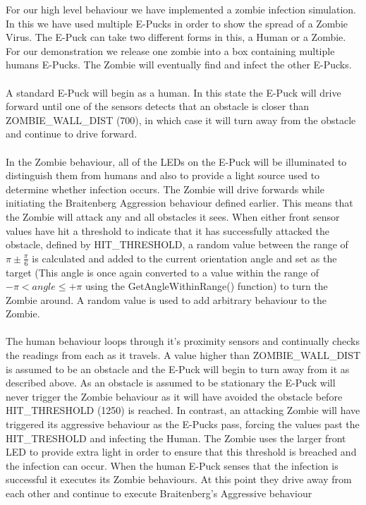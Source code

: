 \documentclass[11pt]{article}
\begin{document}
For our high level behaviour we have implemented a zombie infection simulation. In this we have used multiple E-Pucks in order to show the spread of a Zombie Virus. The E-Puck can take two different forms in this, a Human or a Zombie. For our demonstration we release one zombie into a box containing multiple humans E-Pucks. The Zombie will eventually find and infect the other E-Pucks.
\\
\\
A standard E-Puck will begin as a human. In this state the E-Puck will drive forward until one of the sensors detects that an obstacle is closer than ZOMBIE\_WALL\_DIST (700), in which case it will turn away from the obstacle and continue to drive forward. 
\\
\\
In the Zombie behaviour, all of the LEDs on the E-Puck will be illuminated to distinguish them from humans and also to provide a light source used to determine whether infection occurs. The Zombie will drive forwards while initiating the Braitenberg Aggression behaviour defined earlier. This means that the Zombie will attack any and all obstacles it sees. When either front sensor values have hit a threshold to indicate that it has successfully attacked the obstacle, defined by HIT\_THRESHOLD, a random value between the range of  \begin{math}\pi \pm \frac{\pi}{6}\end{math} is calculated and added to the current orientation angle and set as the target (This angle is once again converted to a value within the range of \begin{math}-\pi < angle \leq +\pi\end{math} using the GetAngleWithinRange() function) to turn the Zombie around. A random value is used to add arbitrary behaviour to the Zombie.
\\
\\
The human behaviour loops through it's proximity sensors and continually checks the readings from each as it travels. A value higher than ZOMBIE\_WALL\_DIST is assumed to be an obstacle and the E-Puck will begin to turn away from it as described above. As an obstacle is assumed to be stationary the E-Puck will never trigger the Zombie behaviour as it will have avoided the obstacle before HIT\_THRESHOLD (1250) is reached. In contrast, an attacking Zombie will have triggered its aggressive behaviour as the E-Pucks pass, forcing the values past the HIT\_TRESHOLD and infecting the Human. The Zombie uses the larger front LED to provide extra light in order to ensure that this threshold is breached and the infection can occur. When the human E-Puck senses that the infection is successful it executes its Zombie behaviours. At this point they drive away from each other and continue to execute Braitenberg's Aggressive behaviour
\end{document}
